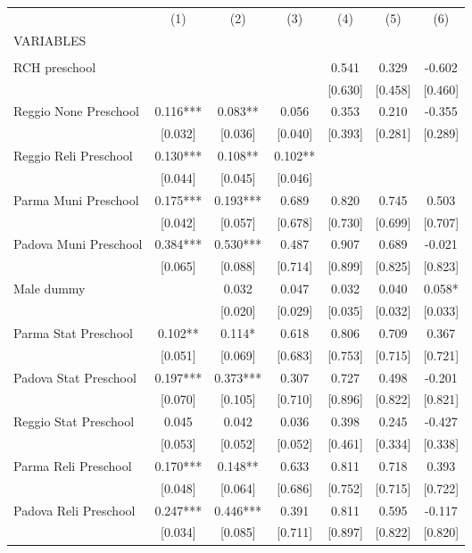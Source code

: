 \begin{tabular}{lcccccc} \hline
 & (1) & (2) & (3) & (4) & (5) & (6) \\
VARIABLES &  &  &  &  &  &  \\ \hline
 &  &  &  &  &  &  \\
RCH preschool &  &  &  & 0.541 & 0.329 & -0.602 \\
 &  &  &  & [0.630] & [0.458] & [0.460] \\
Reggio None Preschool & 0.116*** & 0.083** & 0.056 & 0.353 & 0.210 & -0.355 \\
 & [0.032] & [0.036] & [0.040] & [0.393] & [0.281] & [0.289] \\
Reggio Reli Preschool & 0.130*** & 0.108** & 0.102** &  &  &  \\
 & [0.044] & [0.045] & [0.046] &  &  &  \\
Parma Muni Preschool & 0.175*** & 0.193*** & 0.689 & 0.820 & 0.745 & 0.503 \\
 & [0.042] & [0.057] & [0.678] & [0.730] & [0.699] & [0.707] \\
Padova Muni Preschool & 0.384*** & 0.530*** & 0.487 & 0.907 & 0.689 & -0.021 \\
 & [0.065] & [0.088] & [0.714] & [0.899] & [0.825] & [0.823] \\
Male dummy &  & 0.032 & 0.047 & 0.032 & 0.040 & 0.058* \\
 &  & [0.020] & [0.029] & [0.035] & [0.032] & [0.033] \\
Parma Stat Preschool & 0.102** & 0.114* & 0.618 & 0.806 & 0.709 & 0.367 \\
 & [0.051] & [0.069] & [0.683] & [0.753] & [0.715] & [0.721] \\
Padova Stat Preschool & 0.197*** & 0.373*** & 0.307 & 0.727 & 0.498 & -0.201 \\
 & [0.070] & [0.105] & [0.710] & [0.896] & [0.822] & [0.821] \\
Reggio Stat Preschool & 0.045 & 0.042 & 0.036 & 0.398 & 0.245 & -0.427 \\
 & [0.053] & [0.052] & [0.052] & [0.461] & [0.334] & [0.338] \\
Parma Reli Preschool & 0.170*** & 0.148** & 0.633 & 0.811 & 0.718 & 0.393 \\
 & [0.048] & [0.064] & [0.686] & [0.752] & [0.715] & [0.722] \\
Padova Reli Preschool & 0.247*** & 0.446*** & 0.391 & 0.811 & 0.595 & -0.117 \\
 & [0.034] & [0.085] & [0.711] & [0.897] & [0.822] & [0.820] \\

\end{tabular}
